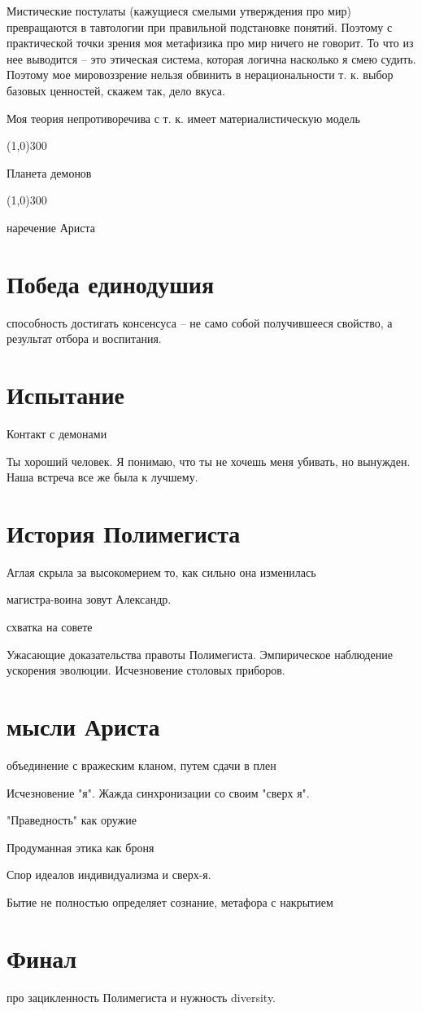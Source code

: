 \documentclass[12pt,a4paper]{article}
\newcommand{\sep}{
	\begin{center}
		\line(1,0){300}
	\end{center}
}
\begin{document}
Мистические постулаты (кажущиеся смелыми утверждения про мир) превращаются в тавтологии при правильной подстановке понятий. Поэтому с практической точки зрения моя метафизика про мир ничего не говорит. То что из нее выводится -- это этическая система, которая логична насколько я смею судить. Поэтому мое мировоззрение нельзя обвинить в нерациональности т. к. выбор базовых ценностей, скажем так, дело вкуса.

Моя теория непротиворечива с т. к. имеет материалистическую модель
\sep

Планета демонов

\sep

наречение Ариста

\section*{Победа единодушия}

способность достигать консенсуса -- не само собой получившееся свойство, а результат отбора и воспитания.

\section*{Испытание}

Контакт с демонами

Ты хороший человек. Я понимаю, что ты не хочешь меня убивать, но вынужден. Наша встреча все же была к лучшему.

\section*{История Полимегиста}

Аглая скрыла за высокомерием то, как сильно она изменилась

магистра-воина зовут Александр.

схватка на совете

Ужасающие доказательства правоты Полимегиста. Эмпирическое наблюдение ускорения эволюции. Исчезновение столовых приборов. 

\section*{мысли Ариста}

объединение с вражеским кланом, путем сдачи в плен

Исчезновение "я". Жажда синхронизации со своим "сверх я".

"Праведность" как оружие

Продуманная этика как броня

Спор идеалов индивидуализма и сверх-я. 

Бытие не полностью определяет сознание, метафора с накрытием

\section*{Финал}

про зацикленность Полимегиста и нужность diversity.
\end{document}
